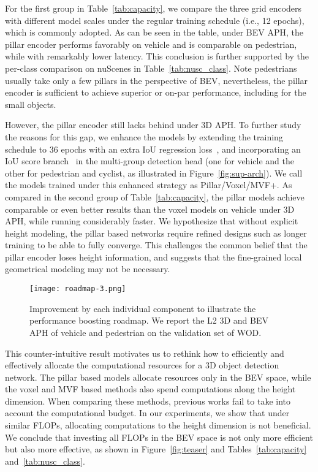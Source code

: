 \documentclass[10pt,twocolumn,letterpaper]{article}
\begin{document}
For the first group in Table~\ref{tab:capacity}, we compare the three grid encoders with different model scales under the regular training schedule (i.e., 12 epochs), which is commonly adopted. As can be seen in the table, under BEV APH, the pillar encoder performs favorably on vehicle and is comparable on pedestrian, while with remarkably lower latency. This conclusion is further supported by the per-class comparison on nuScenes in Table~\ref{tab:nusc_class}. Note pedestrians usually take only a few pillars in the perspective of BEV, nevertheless, the pillar encoder is sufficient to achieve superior or on-par performance, including for the small objects.  

However, the pillar encoder still lacks behind under 3D APH. To further study the reasons for this gap, we enhance the models by extending the training schedule to 36 epochs with an extra IoU regression loss~\cite{shi2022pillarnet}, and incorporating an IoU score branch~\cite{hu2022afdetv2} in the multi-group detection head (one for vehicle and the other for pedestrian and cyclist, as illustrated in Figure~\ref{fig:sup-arch}).  
We call the models trained under this enhanced strategy as Pillar/Voxel/MVF+. As compared in the second group of Table~\ref{tab:capacity}, the pillar models achieve comparable or even better results than the voxel models on vehicle under 3D APH, while running considerably faster. We hypothesize that without explicit height modeling, the pillar based networks require refined designs such as longer training to be able to fully converge. This challenges the common belief that the pillar encoder loses height information, and suggests that the fine-grained local geometrical modeling may not be necessary. 




\begin{figure}[t]
    \centering
    \texttt{[image: roadmap-3.png]}
    \caption{Improvement by each individual component to illustrate the performance boosting roadmap. We report the L2 3D and BEV APH of vehicle and pedestrian on the validation set of WOD.}
    \vspace{-2mm}
    \label{fig:roadmap}
\end{figure}




This counter-intuitive result motivates us to rethink how to efficiently and effectively allocate the computational resources for a 3D object detection network. The pillar based models allocate resources only in the BEV space, while the voxel and MVF based methods also spend computations along the height dimension. When comparing these methods, previous works fail to take into account the computational budget. In our experiments, we show that under similar FLOPs, allocating computations to the height dimension is not beneficial. We conclude that investing all FLOPs in the BEV space is not only more efficient but also more effective, as shown in Figure~\ref{fig:teaser} and Tables~\ref{tab:capacity} and~\ref{tab:nusc_class}.
\end{document}

